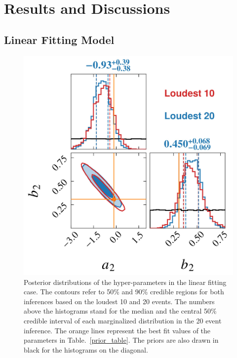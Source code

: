 \documentclass[a4paper,11pt]{article}
\begin{document}
\section{Results and Discussions}
\label{sec4}

\subsection{Linear Fitting Model}
\label{sec4_1}

\begin{figure}
    \centering
    \includegraphics[width=0.5\linewidth]{comparison_corner_plot.pdf}
    \caption{Posterior distributions of the hyper-parameters in the linear fitting case. The contours refer to 50\% and 90\% credible regions for both inferences based on the loudest 10 and 20 events. The numbers above the histograms stand for the median and the central 50\% credible interval of each marginalized distribution in the 20 event inference. The orange lines represent the best fit values of the parameters in Table.~\ref{prior_table}. The priors are also drawn in black for the histograms on the diagonal.}
    \label{corner2-d}
\end{figure}
\end{document}
